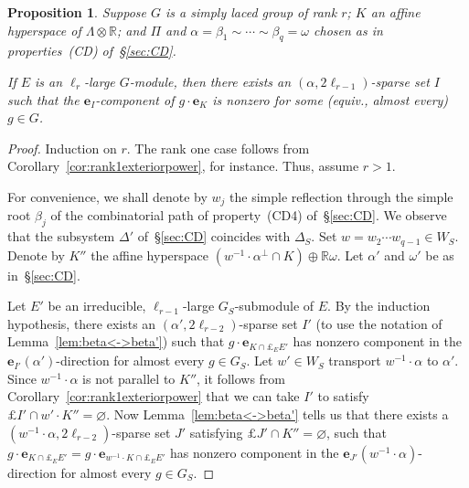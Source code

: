 \documentclass{amsart}
\theoremstyle{plain}
\newtheorem{proposition}[theorem]{Proposition}
\theoremstyle{definition}
\theoremstyle{remark}
\newcommand{\Vect}[1]{\mathbold{#1}}
\begin{document}
\begin{proposition}\label{prop:e_kVg.e_k}
Suppose $G$ is a simply laced group of rank $r$; $K$ an affine hyperspace of $\Lambda \otimes
\mathbb{R}$; and $\Pi$ and $\alpha = \beta_{1} \sim \cdots \sim \beta_{q} = \omega$
chosen as in properties~\textup{(CD)} of~\S\ref{sec:CD}.

If $E$ is an $\ell_{r}$-large $G$-module, then there exists an $(\alpha, 2\ell_{r -
1})$-sparse set $I$ such that the $\Vect{e}_{I}$-component of $g \cdot \Vect{e}_{K}$
is nonzero for some (equiv., almost every) $g \in G$.
\end{proposition}
\begin{proof}
Induction on $r$. The rank one case follows from
Corollary~\ref{cor:rank1exteriorpower}, for instance. Thus, assume $r > 1$.

For convenience, we shall denote by $w_{j}$ the simple reflection through the simple root
$\beta_{j}$ of the combinatorial path of property~(CD4) of~\S\ref{sec:CD}. We observe that the
subsystem
$\Delta'$ of~\S\ref{sec:CD} coincides with $\Delta_{S}$. Set $w = w_{2} \cdots w_{q - 1} \in W_{S}$. Denote by $K''$ the affine hyperspace
$(w ^{-1}\cdot \alpha^{\perp} \cap K) \oplus \mathbb{R}\omega$. Let $\alpha'$ and $\omega'$ be
as in~\S\ref{sec:CD}.

Let $E'$ be an irreducible, $\ell_{r - 1}$-large $G_{S}$-submodule of $E$. By the induction
hypothesis, there exists an $(\alpha', 2\ell_{r - 2})$-sparse set $I'$ (to
use the notation of Lemma~\ref{lem:beta<->beta'}) such
that $g \cdot \Vect{e}_{K \cap \pounds_{E} E'}$ has nonzero component in the $\Vect{e}_{I'}(\alpha')$-direction
for almost every $g \in G_{S}$.
Let $w' \in W_{S}$ transport $w^{-1} \cdot \alpha$ to $\alpha'$.
Since $w^{-1} \cdot \alpha$ is not parallel to $K''$, it follows from Corollary~\ref{cor:rank1exteriorpower}
that we can take $I'$ to satisfy $\pounds
I' \cap w' \cdot K'' = \varnothing$. Now Lemma~\ref{lem:beta<->beta'} tells us that there
exists a $(w^{-1} \cdot \alpha, 2\ell_{r - 2})$-sparse set $J'$ satisfying $\pounds
J' \cap K'' = \varnothing$, such
that $g \cdot \Vect{e}_{K \cap \pounds_{E} E'} = g \cdot \Vect{e}_{w^{-1} \cdot K \cap
\pounds_{E}
E'}$ has nonzero component in the $\Vect{e}_{J'}(w^{-1} \cdot \alpha)$-direction
for almost every $g \in G_{S}$.


\end{proof}
\end{document}
